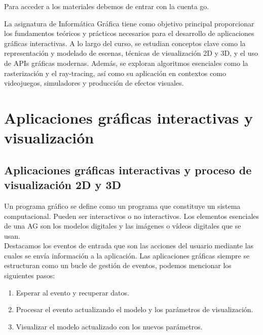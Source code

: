 \documentclass[12pt]{report} %
\providecommand{\tightlist}{%
  \setlength{\itemsep}{0pt}\setlength{\parskip}{0pt}}
\begin{document}
Para acceder a los materiales debemos de entrar con la cuenta go.

La asignatura de Informática Gráfica tiene como objetivo principal
proporcionar los fundamentos teóricos y prácticos necesarios para el
desarrollo de aplicaciones gráficas interactivas. A lo largo del curso,
se estudian conceptos clave como la representación y modelado de
escenas, técnicas de visualización 2D y 3D, y el uso de APIs gráficas
modernas. Además, se exploran algoritmos esenciales como la
rasterización y el ray-tracing, así como su aplicación en contextos como
videojuegos, simuladores y producción de efectos visuales.

\hypertarget{aplicaciones-gruxe1ficas-interactivas-y-visualizaciuxf3n}{%
\chapter{Aplicaciones gráficas interactivas y
visualización}\label{aplicaciones-gruxe1ficas-interactivas-y-visualizaciuxf3n}}

\hypertarget{aplicaciones-gruxe1ficas-interactivas-y-proceso-de-visualizaciuxf3n-2d-y-3d}{%
\section{Aplicaciones gráficas interactivas y proceso de visualización
2D y
3D}\label{aplicaciones-gruxe1ficas-interactivas-y-proceso-de-visualizaciuxf3n-2d-y-3d}}

Un programa gráfico se define como un programa que constituye un sistema
computacional. Pueden ser interactivos o no interactivos. Los elementos
esenciales de una AG son los modelos digitales y las imágenes o vídeos
digitales que se usan.\\
Destacamos los eventos de entrada que son las acciones del usuario
mediante las cuales se envía información a la aplicación. Las
aplicaciones gráficas siempre se estructuran como un bucle de gestión de
eventos, podemos mencionar los siguientes pasos:

\begin{enumerate}
\def\labelenumi{\arabic{enumi}.}
\tightlist
\item
  Esperar al evento y recuperar datos.\\
\item
  Procesar el evento actualizando el modelo y los parámetros de
  visualización.\\
\item
  Visualizar el modelo actualizado con los nuevos parámetros.
\end{enumerate}
\end{document}

